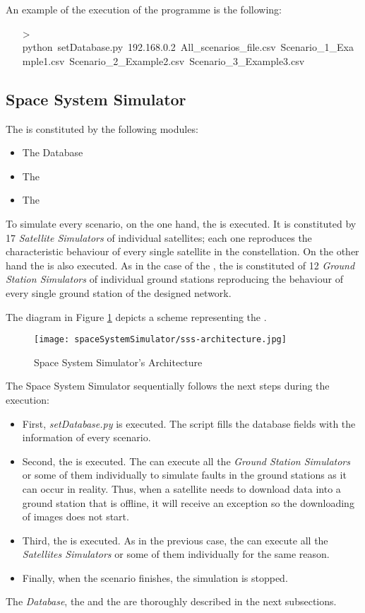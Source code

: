 An example of the execution of the programme is the following:
\begin{itemize}
\item[>] python~setDatabase.py~192.168.0.2~All\_scenarios\_file.csv~Scenario\_1\_Example1.csv~Scenario\_2\_Example2.csv~Scenario\_3\_Example3.csv
\end{itemize}


\subsection{Space System Simulator}

The \sss is constituted by the following modules:
\begin{itemize}
\item The Database
\item The \satss
\item The \gsss
\end{itemize}


To simulate every scenario, on the one hand, the \satss is executed. It is
constituted by 17 \emph{Satellite Simulators} of individual satellites; each one
reproduces the characteristic behaviour of every single satellite in the
constellation.
On the other hand the \gsss is also executed. As in the case of the \satss, the
\gsss is constituted of 12 \emph{Ground Station Simulators} of individual ground
stations reproducing the behaviour of every single ground station of the
designed network.

The diagram in Figure \ref{fig:sss-architecture} depicts a scheme
representing the \sss.

\begin{figure}[!h]
\begin{center}
\texttt{[image: spaceSystemSimulator/sss-architecture.jpg]}
\caption{Space System Simulator's Architecture}
\label{fig:sss-architecture}
\end{center}
\end{figure}

The Space System Simulator sequentially follows the next steps during the
execution:
\begin{itemize}

\item First, \emph{setDatabase.py} is executed. The script fills the database fields with the information of every scenario.
\item Second, the \gsss is executed. The \gsss can execute all the \emph{Ground Station Simulators} or some of them individually to simulate faults in the ground stations as it can occur in reality. Thus, when a satellite needs to download data into a ground station that is offline, it will receive an exception so the downloading of images does not start.
\item Third, the \satss is executed. As in the previous case, the \satss can execute all the \emph{Satellites Simulators} or some of them individually for the same reason.
\item Finally, when the scenario finishes, the simulation is stopped.
\end{itemize}
The \emph{Database}, the \satss and the \gsss are thoroughly described in the
next subsections.

